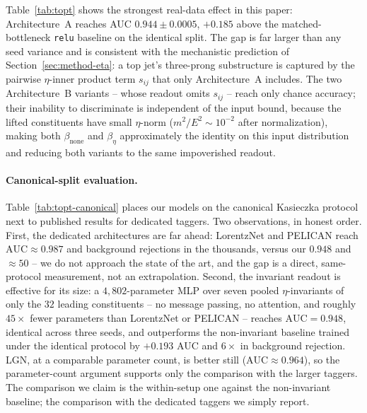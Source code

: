 \documentclass[11pt]{article}
\begin{document}
Table~\ref{tab:topt} shows the strongest real-data effect in this
paper: Architecture~A reaches AUC $0.944\pm 0.0005$, $+0.185$ above the
matched-bottleneck \texttt{relu} baseline on the identical split. The
gap is far larger than any seed variance and is consistent with the
mechanistic prediction of Section~\ref{sec:method-eta}: a top jet's
three-prong substructure is captured by the pairwise $\eta$-inner
product term $s_{ij}$ that only Architecture~A includes. The two
Architecture~B variants -- whose readout omits $s_{ij}$ -- reach only
chance accuracy; their inability to discriminate is independent of the
input bound, because the lifted constituents have small $\eta$-norm
($m^2/E^2 \sim 10^{-2}$ after normalization), making both
$\beta_{\text{none}}$ and $\beta_\eta$ approximately the identity on
this input distribution and reducing both variants to the same
impoverished readout.

\paragraph{Canonical-split evaluation.}
Table~\ref{tab:topt-canonical} places our models on the canonical
Kasieczka protocol next to published results for dedicated taggers.
Two observations, in honest order. First, the dedicated architectures
are far ahead: LorentzNet and PELICAN reach $\mathrm{AUC} \approx
0.987$ and background rejections in the thousands, versus our $0.948$
and $\approx 50$ -- we do not approach the state of the art, and the
gap is a direct, same-protocol measurement, not an extrapolation.
Second, the invariant readout is effective for its size: a
$4{,}802$-parameter MLP over seven pooled $\eta$-invariants of only
the $32$ leading constituents -- no message passing, no attention, and
roughly $45\times$ fewer parameters than LorentzNet or PELICAN --
reaches $\mathrm{AUC} = 0.948$, identical across three seeds, and
outperforms the non-invariant baseline trained under the identical
protocol by $+0.193$ AUC and $6\times$ in background rejection. LGN,
at a comparable parameter count, is better still ($\mathrm{AUC}
\approx 0.964$), so the parameter-count argument supports only the
comparison with the larger taggers. The comparison we claim is the
within-setup one against the non-invariant baseline; the comparison
with the dedicated taggers we simply report.
\end{document}
